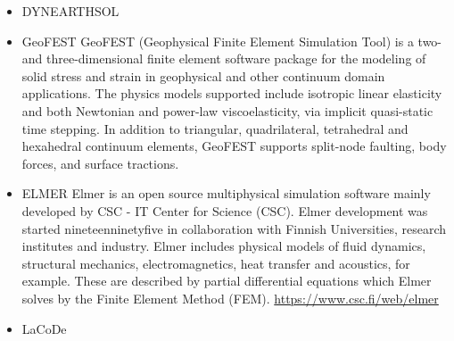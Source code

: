 \begin{itemize}
\begin{scriptsize}
\cite{stfl11}
\end{scriptsize} 

\item {\codefont DYNEARTHSOL} 

\begin{scriptsize} 
\cite{chtl13}
\cite{jalr15}
\cite{lolc17}
\end{scriptsize} 

\item {\codefont GeoFEST} 
GeoFEST (Geophysical Finite Element Simulation Tool) is a two- and three-dimensional finite
element software package for the modeling of solid stress and strain in geophysical and 
other continuum domain applications.
The physics models supported include isotropic linear elasticity and both Newtonian and power-law
viscoelasticity, via implicit quasi-static time stepping. In addition to triangular, 
quadrilateral, tetrahedral and hexahedral continuum elements, GeoFEST supports split-node 
faulting, body forces, and surface tractions.


{\small
\noindent
\cite{paln08}
}

\item {\codefont ELMER} 
Elmer is an open source multiphysical simulation software mainly developed by 
CSC - IT Center for Science (CSC). Elmer development was started nineteenninetyfive in collaboration with 
Finnish Universities, research institutes and industry. Elmer includes physical models of 
fluid dynamics, structural mechanics, electromagnetics, heat transfer and acoustics, 
for example. These are described by partial differential equations which Elmer solves 
by the Finite Element Method (FEM). \url{https://www.csc.fi/web/elmer}

\cite{maierova}
\cite{mals14}

\item {\codefont LaCoDe}  


\end{itemize}
